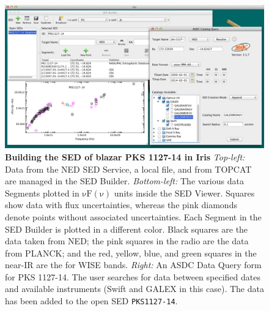 \documentclass[final,5p,authoryear]{elsarticle}
\begin{document}
\begin{figure} \centering
\includegraphics[height=0.3\textheight]{figures/built-in-visuals-loading1.png}
\caption{\textbf{Building the SED of blazar PKS 1127-14 in Iris}
\textit{Top-left:} Data from the NED SED Service, a local file, and from TOPCAT
are managed in the SED Builder. \textit{Bottom-left:} The various data Segments
plotted in $\mathrm{\nu F \left( \nu \right)}$ units inside the SED Viewer.
Squares show data with flux uncertainties, whereas the pink diamonds denote
points without associated uncertainties. Each Segment in the SED Builder is
plotted in a different color. Black squares are the data taken from NED; the
pink squares in the radio are the data from PLANCK; and the red, yellow, blue,
and green squares in the near-IR are the for WISE bands. \textit{Right:} An ASDC
Data Query form for PKS 1127-14. The user searches for data between specified
dates and available instruments (Swift and GALEX in this case). The data has
been added to the open SED \texttt{PKS1127-14}.} \label{fig:load_data}
\end{figure}
\end{document}
